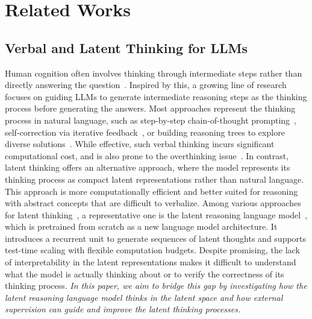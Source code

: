 \documentclass{article} %
\begin{document}
\section{Related Works}\label{appendix:related_works}
\subsection{Verbal and Latent Thinking for LLMs}
Human cognition often involves thinking through intermediate steps rather than directly answering the question~\citep{kahneman2011thinking,zelikman2024quietstar}. 
%
Inspired by this, a growing line of research focuses on guiding LLMs to generate intermediate reasoning steps as the thinking process before generating the answers. 
%
Most approaches represent the thinking process in natural language, such as step-by-step chain-of-thought prompting~\citep{wei2022chain,kojima2022large,wang2023selfconsistency}, self-correction via iterative feedback~\citep{shinn2023reflexion,madaan2023self,kumar2025training}, or building reasoning trees to explore diverse solutions~\citep{yao2023tree,hao2023reasoning}. 
%
While effective, such verbal thinking incurs significant computational cost, and is also prone to the overthinking issue~\citep{chen2025do,sui2025stop}. 
%
In contrast, latent thinking offers an alternative approach, where the model represents its thinking process as compact latent representations rather than natural language. This approach is more computationally efficient and better suited for reasoning with abstract concepts that are difficult to verbalize. Among various approaches for latent thinking~\citep{zhang2023planner,goyal2024think,hao2025training,geiping2025scaling}, a representative one is the latent reasoning language model~\citep{geiping2025scaling}, which is pretrained from scratch as a new language model architecture. It introduces a recurrent unit to generate sequences of latent thoughts and supports test-time scaling with flexible computation budgets. 
%
Despite promising, the lack of interpretability in the latent representations makes it difficult to understand what the model is actually thinking about or to verify the correctness of its thinking process. 
%
\emph{In this paper, we aim to bridge this gap by investigating how the latent reasoning language model thinks in the latent space and how external supervision can guide and improve the latent thinking processes.}
\end{document}
